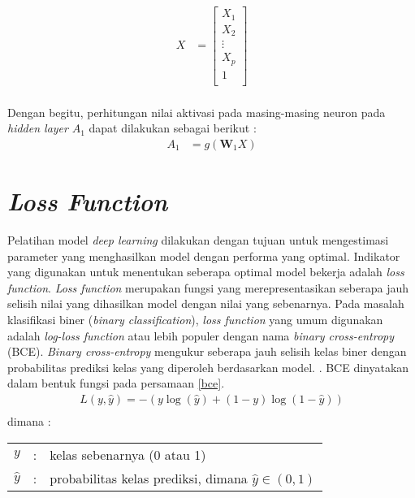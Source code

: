 \documentclass[a4paper,12pt]{report}
\begin{document}
\begin{equation}
	\begin{split}
		X &=  
		\begin{bmatrix}
			X_{1}  \\
			X_{2}  \\
			\vdots    \\ 
			X_{p}  \\
			1 \\
		\end{bmatrix} \\
	\end{split}
	\label{vektorXl}
\end{equation}


Dengan begitu, perhitungan nilai aktivasi pada masing-masing neuron pada \textit{hidden layer} $A_1$ dapat dilakukan sebagai berikut \cite{sohilIntroductionStatisticalLearning2022} :
\begin{equation}
	\begin{split}
		A_{1} &= g\left( \mathbf{W}_1X \right)  
	\end{split}
	\label{vektorAl}
\end{equation} 

\section{\textit{Loss Function}}
Pelatihan model \textit{deep learning} dilakukan dengan tujuan untuk mengestimasi parameter yang menghasilkan model dengan performa yang optimal. Indikator yang digunakan untuk menentukan seberapa optimal model bekerja adalah \textit{loss function}. \textit{Loss function} merupakan fungsi yang merepresentasikan seberapa jauh selisih nilai yang dihasilkan model dengan nilai yang sebenarnya. Pada masalah klasifikasi biner (\textit{binary classification}), \textit{loss function} yang umum digunakan adalah \textit{log-loss function} atau lebih populer dengan nama \textit{binary cross-entropy} (BCE). \textit{Binary cross-entropy} mengukur seberapa jauh selisih kelas biner dengan probabilitas prediksi kelas yang diperoleh berdasarkan model. \cite{elharroussLossFunctionsDeep2025}. BCE dinyatakan dalam bentuk fungsi pada persamaan \ref{bce}.
\begin{equation}
	\begin{split}
		L(y, \hat{y}) = - (y \log(\hat{y}) + (1 - y) \log(1 - \hat{y})) \\
	\end{split}
	\label{bce}
\end{equation}
dimana : \\
\begin{tabular}{p{1cm} p{0.5cm} p{10cm}}
	$y$ &:& kelas sebenarnya (0 atau 1) \\
	$\hat{y}$ &:& probabilitas kelas prediksi, dimana {$\hat{y} \in (0, 1)$} \\
\end{tabular} \\
\end{document}
